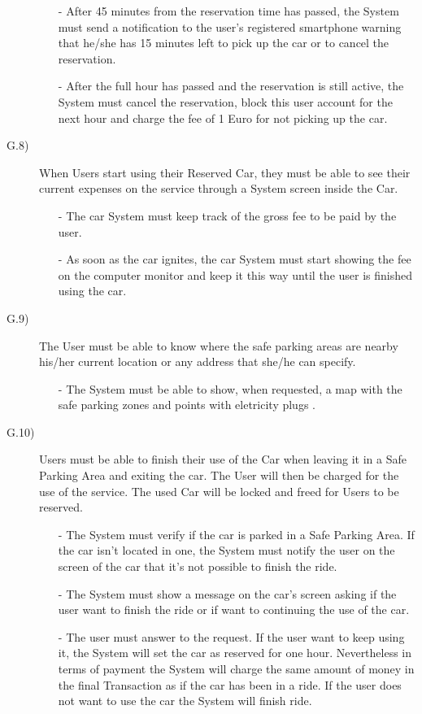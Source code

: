 \documentclass[a4paper]{article}
\begin{document}
\begin{description}
\begin{itemize}
	\item[-]After 45 minutes from the reservation time has passed, the System must send a notification to the user's registered smartphone warning that he/she has 15 minutes left to pick up the car or to cancel the reservation.
	\item[-]After the full hour has passed and the reservation is still active, the System must cancel the reservation, block this user account for the next hour and charge the fee of 1 Euro for not picking up the car.
\end{itemize}
\item [G.8)]When Users start using their Reserved Car, they must be able to see their current expenses on the service through a System screen inside the Car.
\begin{itemize}
	\item[-]The car System must keep track of the gross fee to be paid by the user.
	\item[-]As soon as the car ignites, the car System must start showing the fee on the computer monitor and keep it this way until the user is finished using the car.
\end{itemize}
\item [G.9)]The User must be able to know where the safe parking areas are nearby his/her current location or any address that she/he can specify.
\begin{itemize}
	\item[-]The System must be able to show, when requested, a map with the safe parking zones and points with eletricity plugs .
\end{itemize}
\item [G.10)]Users must be able to finish their use of the Car when leaving it in a Safe Parking Area and exiting the car. The User will then be charged for the use of the service. The used Car will be locked and freed for Users to be reserved.
\begin{itemize}
	\item[-]The System must verify if the car is parked in a Safe Parking Area. If the car isn't located in one, the System must notify the user on the screen of the car that it's not possible to finish the ride.
	\item[-]The System must show a message on the car's screen asking if the user want to finish the ride or if want to continuing the use of the car.
	\item[-]The user must answer to the request. If the user want to keep using it, the System will set the car as reserved for one hour. Nevertheless in terms of payment the System will charge the same amount of money in the final Transaction as if the car has been in a ride. If the user does not want to use the car the System will finish ride.

\end{itemize}
\end{description}
\end{document}
